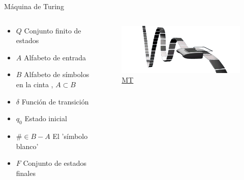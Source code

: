 \begin{frame}[fragile]{Máquina de Turing}

		\begin{columns}
		\begin{column}{0.5\textwidth}
			\begin{itemize}
				\item $Q$  Conjunto finito de estados
				\item $A$  Alfabeto de entrada
				\item $B$  Alfabeto de símbolos en la cinta , $A\subset B$
				\item $\delta$ Función de transición
				\item $q_0$ Estado inicial
				\item $\# \in B-A$ El 'símbolo blanco'
				\item $F$ Conjunto de estados finales
			\end{itemize}
		\end{column}
		\begin{column}{0.5\textwidth}
			\pause
			\begin{figure}
				\centering
				
				\includegraphics[width=\textwidth]{Automatas/turingMahchine}
				\caption{\href{https://es.wikipedia.org/wiki/Aut\%C3\%B3mata_finito}{MT}}	
			\end{figure}
		\end{column}
	\end{columns}
	
\end{frame}


